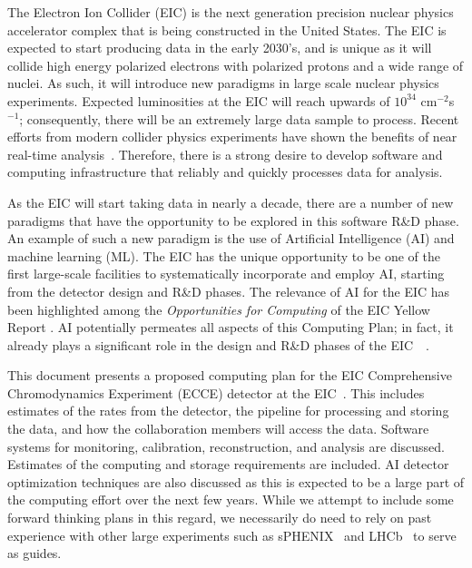 

The Electron Ion Collider (EIC) is the next generation precision nuclear physics accelerator complex that is being constructed in the United States. The EIC is expected to start producing data in the early 2030's, and is unique as it will collide high energy polarized electrons with polarized protons and a wide range of nuclei. As such, it will introduce new paradigms in large scale nuclear physics experiments. Expected luminosities at the EIC will reach upwards of $10^{34}$ cm$^{-2}$s$^{-1}$; consequently, there will be an extremely large data sample to process. Recent efforts from modern collider physics experiments have shown the benefits of near real-time analysis~\cite{Benson_2015,Aaij_2019}. Therefore, there is a strong desire to develop software and computing infrastructure that reliably and quickly processes data for analysis. 



As the EIC will start taking data in nearly a decade, there are a number of new paradigms that have the opportunity to be explored in this software R\&D phase. An example of such a new paradigm is the use of Artificial Intelligence (AI) and machine learning (ML). The EIC has the unique opportunity to be one of the first large-scale facilities to systematically incorporate and employ AI, starting from the detector design and R\&D phases. The relevance of AI for the EIC has been highlighted among the \textit{Opportunities for Computing} of the EIC Yellow Report \cite{YellowReport}. AI potentially permeates all aspects of this Computing Plan; in fact, it already plays a significant role in the design and R\&D phases of the EIC~\cite{cisbani2020ai}~\cite{AI4EIC2021}.

This document presents a proposed computing plan for the EIC Comprehensive Chromodynamics Experiment (ECCE) detector at the EIC~\cite{YellowReport}. This includes estimates of the rates from the detector, the pipeline for processing and storing the data, and how the collaboration members will access the data. Software systems for monitoring, calibration, reconstruction, and analysis are discussed. Estimates of the computing and storage requirements are included. AI detector optimization techniques are also discussed as this is expected to be a large part of the computing effort over the next few years. While we attempt to include some forward thinking plans in this regard, we necessarily do need to rely on past experience with other large experiments such as sPHENIX~\cite{sphenix_computing_plan_2019} and LHCb~\cite{CAMPORAPEREZ2016280} to serve as guides.






